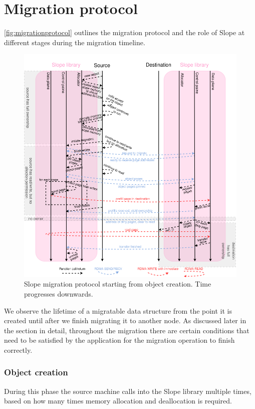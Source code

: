 \section{Migration protocol}
\label{sec:migrationprotocol}

\autoref{fig:migrationprotocol} outlines the migration protocol and the role
of Slope at different stages during the migration timeline.

\begin{figure}[tp]
\centering

\includegraphics[width=1\textwidth]{migration-protocol.drawio}
\caption{
    Slope migration protocol starting from object creation. Time progresses
    downwards.
}
\label{fig:migrationprotocol}
\end{figure}

We observe the lifetime of a migratable data structure from the point it is
created until after we finish migrating it to another node. As discussed
later in the section in detail, throughout the migration
there are certain conditions that need to be satisfied by the application
for the migration operation to finish correctly.

\subsubsection{Object creation}
During this phase the source machine calls into the Slope library multiple
times, based on how many times memory allocation and deallocation is required.

